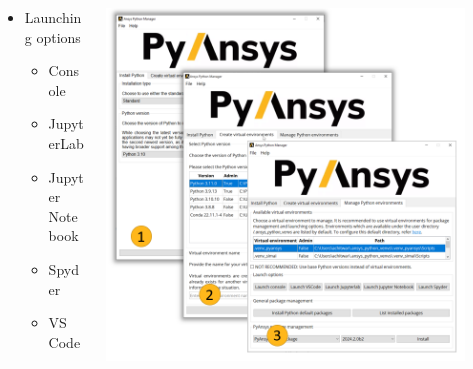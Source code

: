 \documentclass[t]{beamer}
\begin{document}
\begin{frame}
\begin{center}
\begin{columns}[T]
\begin{column}{.5\textwidth}
\begin{noitemize}
					\end{noitemize}
					\begin{itemize}
						\item Launching options
						\begin{itemize}
							\item Console
							\item JupyterLab
							\item Jupyter Notebook
							\item Spyder
							\item VS Code
						\end{itemize}
					\end{itemize}
				\end{column}
				\begin{column}{.5\textwidth}
					\centering
					\includegraphics[width=0.9\textwidth]{assets/ansys_python_manager_screen_2.png}
				\end{column}
			\end{columns}
		\end{center}
	\end{frame}
	
	
	
	
\end{document}
